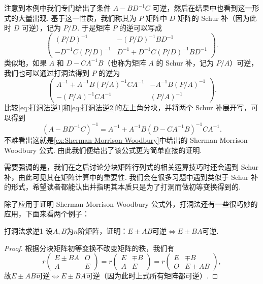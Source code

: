 注意到本例中我们专门给出了条件 $A - BD^{-1}C$ 可逆，然后在结果中也看到这一形式的大量出现. 基于这一性质，我们称其为 $P$ 矩阵中 $D$ 矩阵的 Schur 补（因为此时 $D$ 可逆），记为 $P / D$. 于是矩阵 $P$ 的逆可以写成
\begin{equation} \label{eq:打洞法逆1}
    \begin{pmatrix}
        (P/D)^{-1} & -(P/D)^{-1}BD^{-1} \\ -D^{-1}C(P/D)^{-1} & D^{-1}+D^{-1}C(P/D)^{-1}BD^{-1}
    \end{pmatrix}.
\end{equation}
类似地，如果 $A$ 和 $D - CA^{-1}B$（也称为矩阵 $A$ 的 Schur 补，记为 $P / A$）可逆，我们也可以通过打洞法得到 $P$ 的逆为
\begin{equation} \label{eq:打洞法逆2}
    \begin{pmatrix}
        A^{-1}+A^{-1}B(P/A)^{-1}CA^{-1} & -A^{-1}B(P/A)^{-1} \\ -(P/A)^{-1}CA^{-1} & (P/A)^{-1}
    \end{pmatrix}.
\end{equation}
比较\eqref{eq:打洞法逆1}和\eqref{eq:打洞法逆2}的左上角分块，并将两个 Schur 补展开写，可以得到
\[ (A - BD^{-1}C)^{-1} = A^{-1} + A^{-1}B(D - CA^{-1}B)^{-1}CA^{-1}. \]
不难看出这就是\autoref{ex:Sherman-Morrison-Woodbury}中给出的 Sherman-Morrison-Woodbury 公式. 由此我们便给出了该公式更为简单直接的证明.

需要强调的是，我们在之后讨论分块矩阵行列式的相关运算技巧时还会遇到 Schur 补，由此可见其在矩阵计算中的重要性. 我们会在很多习题中遇到类似于 Schur 补的形式，希望读者都能认出并指明其本质只是为了打洞而做初等变换得到的.

除了应用于证明 Sherman-Morrison-Woodbury 公式外，打洞法还有一些很巧妙的应用，下面来看两个例子：
\begin{example}{}{打洞法求逆1}
    设$A,B$为$n$阶矩阵，证明：$E\pm AB$可逆$\iff E\pm BA$可逆.
\end{example}

\begin{proof}
    根据分块矩阵初等变换不改变矩阵的秩，我们有
    \[r\begin{pmatrix}
            E\pm BA & O \\ A & E
        \end{pmatrix}=r\begin{pmatrix}
            E & \mp B \\ A & E
        \end{pmatrix}=r\begin{pmatrix}
            E & \mp B \\ O & E\pm AB
        \end{pmatrix},\]
    故$E\pm AB$可逆$\iff E\pm BA$可逆（因为此时上式所有矩阵都可逆）.
\end{proof}


